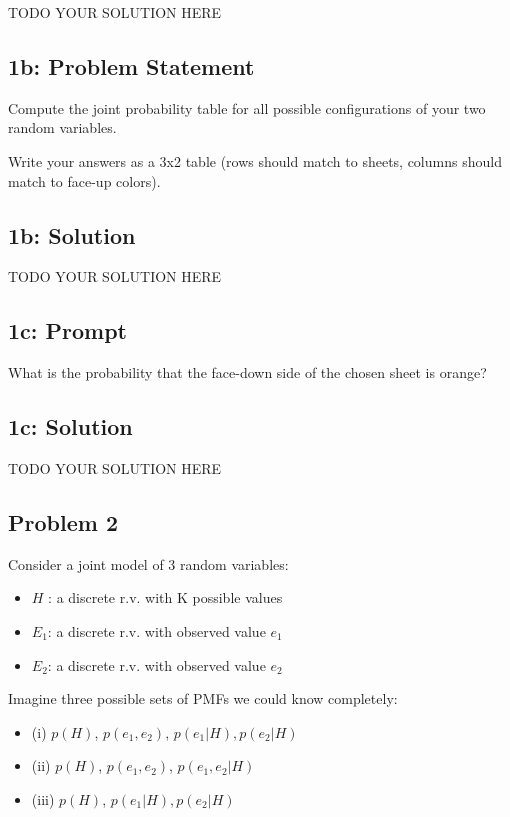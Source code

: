 \documentclass[10pt]{article}
\newcommand{\officialdirections}[1]{{\color{purple} #1}}
\begin{document}
TODO YOUR SOLUTION HERE

\officialdirections{
\subsection*{1b: Problem Statement}
Compute the joint probability table for all possible configurations of your two random variables.

Write your answers as a 3x2 table (rows should match to sheets, columns should match to face-up colors).
}

\subsection{1b: Solution}

TODO YOUR SOLUTION HERE

\officialdirections{
\subsection*{1c: Prompt}
What is the probability that the face-down side of the chosen sheet is orange?
}
\subsection{1c: Solution}

TODO YOUR SOLUTION HERE

\officialdirections{
\subsection*{Problem 2}

Consider a joint model of 3 random variables:

\begin{itemize}
\item $H$ : a discrete r.v. with K possible values
\item $E_1$: a discrete r.v. with observed value $e_1$
\item $E_2$: a discrete r.v. with observed value $e_2$
\end{itemize}

Imagine three possible sets of PMFs we could know completely:

\begin{itemize}
\item (i) $p(H)$, $p(e_1, e_2)$, $p(e_1|H), p(e_2|H)$
\item (ii) $p(H)$, $p(e_1, e_2)$, $p(e_1, e_2|H)$
\item (iii) $p(H)$, $p(e_1|H), p(e_2|H)$
\end{itemize}
}
\end{document}
